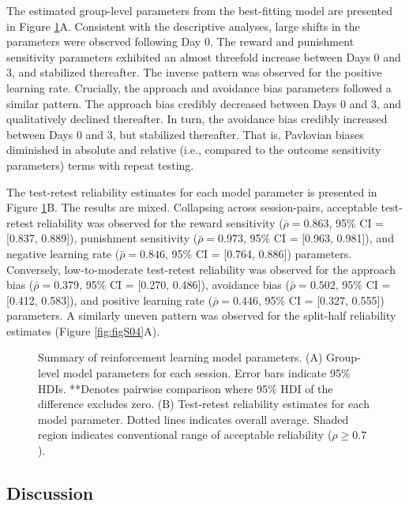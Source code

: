 \documentclass[a4paper,12pt]{article}
\begin{document}
\begin{refsection}[main]
The estimated group-level parameters from the best-fitting model are presented in Figure \ref{fig:exp01_modeling}A. Consistent with the descriptive analyses, large shifts in the parameters were observed following Day 0. The reward and punishment sensitivity parameters exhibited an almost threefold increase between Days 0 and 3, and stabilized thereafter. The inverse pattern was observed for the positive learning rate. Crucially, the approach and avoidance bias parameters followed a similar pattern. The approach bias credibly decreased between Days 0 and 3, and qualitatively declined thereafter. In turn, the avoidance bias credibly increased between Days 0 and 3, but stabilized thereafter. That is, Pavlovian biases diminished in absolute and relative (i.e., compared to the outcome sensitivity parameters) terms with repeat testing. 

The test-retest reliability estimates for each model parameter is presented in Figure \ref{fig:exp01_modeling}B. The results are mixed. Collapsing across session-pairs, acceptable test-retest reliability was observed for the reward sensitivity ($\bar{\rho} = 0.863$, 95\% CI = [0.837, 0.889]), punishment sensitivity ($\bar{\rho} = 0.973$, 95\% CI = [0.963, 0.981]), and negative learning rate ($\bar{\rho} = 0.846$, 95\% CI = [0.764, 0.886]) parameters. Conversely, low-to-moderate test-retest reliability was observed for the approach bias ($\bar{\rho} = 0.379$, 95\% CI = [0.270, 0.486]), avoidance bias ($\bar{\rho} = 0.502$, 95\% CI = [0.412, 0.583]), and positive learning rate ($\bar{\rho} = 0.446$, 95\% CI = [0.327, 0.555]) parameters. A similarly uneven pattern was observed for the split-half reliability estimates (Figure \ref{fig:figS04}A).

\begin{figure}[ht]
    \centerline{}
    \caption{Summary of reinforcement learning model parameters. (A) Group-level model parameters for each session. Error bars indicate 95\% HDIs. **Denotes pairwise comparison where 95\% HDI of the difference excludes zero. (B) Test-retest reliability estimates for each model parameter. Dotted lines indicates overall average. Shaded region indicates conventional range of acceptable reliability ($\rho \geq 0.7$).}
    \label{fig:exp01_modeling}
\end{figure}

\subsection*{Discussion}


\end{refsection}
\end{document}
